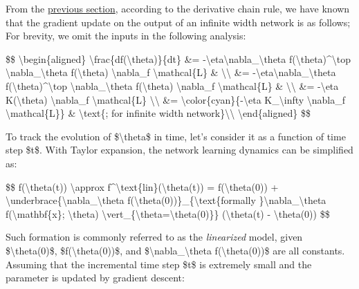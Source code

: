 From the \hyperref[neural-tangent-kernel]{previous section}, according to the derivative chain rule, we have known that the gradient update on the output of an infinite width network is as follows; For brevity, we omit the inputs in the following analysis:

\$\$ \textbackslash begin\{aligned\} \textbackslash frac\{df(\textbackslash theta)\}\{dt\} \&= -\textbackslash eta\textbackslash nabla\_\textbackslash theta f(\textbackslash theta)\^{}\textbackslash top \textbackslash nabla\_\textbackslash theta f(\textbackslash theta) \textbackslash nabla\_f \textbackslash mathcal\{L\} \& \textbackslash\textbackslash{} \&= -\textbackslash eta\textbackslash nabla\_\textbackslash theta f(\textbackslash theta)\^{}\textbackslash top \textbackslash nabla\_\textbackslash theta f(\textbackslash theta) \textbackslash nabla\_f \textbackslash mathcal\{L\} \& \textbackslash\textbackslash{} \&= -\textbackslash eta K(\textbackslash theta) \textbackslash nabla\_f \textbackslash mathcal\{L\} \textbackslash\textbackslash{} \&= \textbackslash color\{cyan\}\{-\textbackslash eta K\_\textbackslash infty \textbackslash nabla\_f \textbackslash mathcal\{L\}\} \& \textbackslash text\{; for infinite width network\}\textbackslash\textbackslash{} \textbackslash end\{aligned\} \$\$

To track the evolution of \$\textbackslash theta\$ in time, let's consider it as a function of time step \$t\$. With Taylor expansion, the network learning dynamics can be simplified as:

\$\$ f(\textbackslash theta(t)) \textbackslash approx f\^{}\textbackslash text\{lin\}(\textbackslash theta(t)) = f(\textbackslash theta(0)) + \textbackslash underbrace\{\textbackslash nabla\_\textbackslash theta f(\textbackslash theta(0))\}\_\{\textbackslash text\{formally \}\textbackslash nabla\_\textbackslash theta f(\textbackslash mathbf\{x\}; \textbackslash theta) \textbackslash vert\_\{\textbackslash theta=\textbackslash theta(0)\}\} (\textbackslash theta(t) - \textbackslash theta(0)) \$\$

Such formation is commonly referred to as the \emph{linearized} model, given \$\textbackslash theta(0)\$, \$f(\textbackslash theta(0))\$, and \$\textbackslash nabla\_\textbackslash theta f(\textbackslash theta(0))\$ are all constants. Assuming that the incremental time step \$t\$ is extremely small and the parameter is updated by gradient descent:


